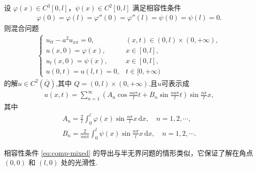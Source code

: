 \documentclass[../../main.tex]{subfiles}%
\begin{document}
\begin{theorem}\label{theorem:一维波动方程的混合问题齐次方程、齐次边值情形的解}
设 $\varphi(x)\in C^3[0,l]$，$\psi(x)\in C^2[0,l]$ 满足相容性条件
\begin{align}
\varphi(0)=\varphi(l)=\varphi''(0)=\varphi''(l)=\psi(0)=\psi(l)=0. \label{eq:comp-mixed}
\end{align}
则混合问题
\begin{align}
\begin{cases}
u_{tt}-a^2u_{xx}=0, & (x,t)\in(0,l)\times(0,+\infty), \\
u(x,0)=\varphi(x), & x\in[0,l], \\
u_t(x,0)=\psi(x), & x\in[0,l], \\
u(0,t)=u(l,t)=0, & t\in[0,+\infty)
\end{cases} \label{eq:wave-mixed-hom}
\end{align}
的解$u\in C^2(\overline{Q})$,其中 $Q=(0,l)\times(0,+\infty)$.且$u$可表示成
\begin{align}
u(x,t)=\sum_{n=1}^{\infty}\left(A_n\cos\frac{na\pi}{l}t+B_n\sin\frac{na\pi}{l}t\right)\sin\frac{n\pi}{l}x, \label{eq:wave-sep-sol}
\end{align}
其中
\begin{gather}
A_n=\frac{2}{l}\int_0^l\varphi(x)\sin\frac{n\pi}{l}x\,\mathrm{d}x,\quad n=1,2,\cdots, \label{eq:wave-A} \\
B_n=\frac{2}{na\pi}\int_0^l\psi(x)\sin\frac{n\pi}{l}x\,\mathrm{d}x,\quad n=1,2,\cdots. \label{eq:wave-B}
\end{gather}
\end{theorem}
\begin{remark}
相容性条件 \eqref{eq:comp-mixed} 的导出与半无界问题的情形类似，它保证了解在角点 $(0,0)$ 和 $(l,0)$ 处的光滑性.
\end{remark}
\end{document}
